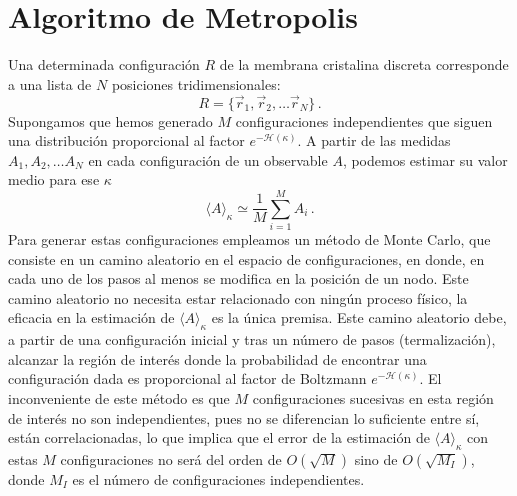 \section{Algoritmo de Metropolis}
Una determinada configuración $R$ de la membrana cristalina discreta 
corresponde a una lista de $N$ posiciones tridimensionales:
\begin{equation*}
R=\{ \vec{r}_1,\vec{r}_2,\dots \vec{r}_N\}\,.
\end{equation*}
Supongamos que hemos generado $M$ configuraciones independientes que siguen una distribución
proporcional al factor $e^{-\mathcal{H}(\kappa)}$. A partir de las medidas
$A_1,A_2,\dots A_N$ en cada configuración de un observable $A$, podemos
estimar su valor medio para ese $\kappa$
\begin{equation*}
\langle A \rangle_{\kappa}\simeq \frac{1}{M}\sum^M_{i=1} A_i\,.
\end{equation*}
Para generar estas configuraciones empleamos un método de Monte Carlo, que
consiste en un camino aleatorio en el espacio de configuraciones, en donde, en
cada uno de los pasos al menos se modifica en la posición de un nodo. Este camino
aleatorio no necesita estar relacionado con ningún proceso físico, la eficacia
en la estimación de $\langle A \rangle_{\kappa}$ es la única premisa. Este
camino aleatorio debe, a partir de una configuración inicial y tras un número
de pasos (termalización), alcanzar la región de interés donde la probabilidad
de encontrar una configuración dada es proporcional al factor de Boltzmann
$e^{-\mathcal{H}(\kappa)}$. El inconveniente de este método es que $M$ 
configuraciones sucesivas en esta región de interés no son independientes, pues no se
diferencian lo suficiente entre sí, están correlacionadas, lo que implica que el
error de la estimación de $\langle A \rangle_{\kappa}$ con estas $M$
configuraciones no será del orden de $O(\sqrt{M})$ sino de $O(\sqrt{M_I})$,
donde $M_I$ es el número de configuraciones independientes.  

